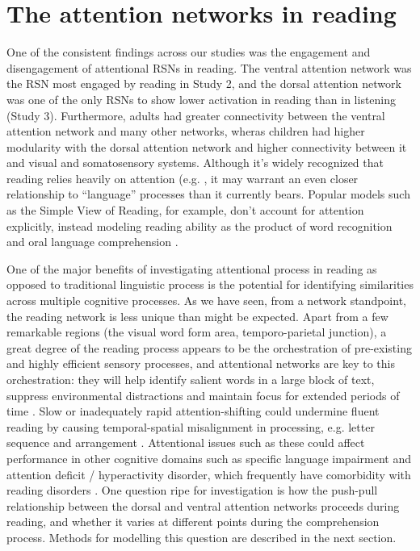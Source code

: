 \section{The attention networks in reading}

One of the consistent findings across our studies was the engagement and disengagement of attentional RSNs in reading. The ventral attention network was the RSN most engaged by reading in Study 2, and the dorsal attention network was one of the only RSNs to show lower activation in reading than in listening (Study 3). Furthermore, adults had greater connectivity between the ventral attention network and many other networks, wheras children had higher modularity with the dorsal attention network and higher connectivity between it and visual and somatosensory systems. Although it's widely recognized that reading relies heavily on attention (e.g. \citep{Vogel2012a, Vidyasagar2010, Clifton2016}, it may warrant an even closer relationship to ``language'' processes than it currently bears. Popular models such as the Simple View of Reading, for example, don't account for attention explicitly, instead modeling reading ability as the product of word recognition and oral language comprehension \citep{Gough1986}. 

One of the major benefits of investigating attentional process in reading as opposed to traditional linguistic process is the potential for identifying similarities across multiple cognitive processes. As we have seen, from a network standpoint, the reading network is less unique than might be expected. Apart from a few remarkable regions (the visual word form area, temporo-parietal junction), a great degree of the reading process appears to be the orchestration of pre-existing and highly efficient sensory processes, and attentional networks are key to this orchestration: they will help identify salient words in a large block of text, suppress environmental distractions and maintain focus for extended periods of time \citep{Fedorenko2014}. Slow or inadequately rapid attention-shifting could undermine fluent reading by causing temporal-spatial misalignment in processing, e.g. letter sequence and arrangement \citep{Lallier2009}. Attentional issues such as these could affect performance in other cognitive domains such as specific language impairment and attention deficit / hyperactivity disorder, which frequently have comorbidity with reading disorders \citep{Pennington2006, Margari2013}. One question ripe for investigation is how the push-pull relationship between the dorsal and ventral attention networks proceeds during reading, and whether it varies at different points during the comprehension process. Methods for modelling this question are described in the next section.


